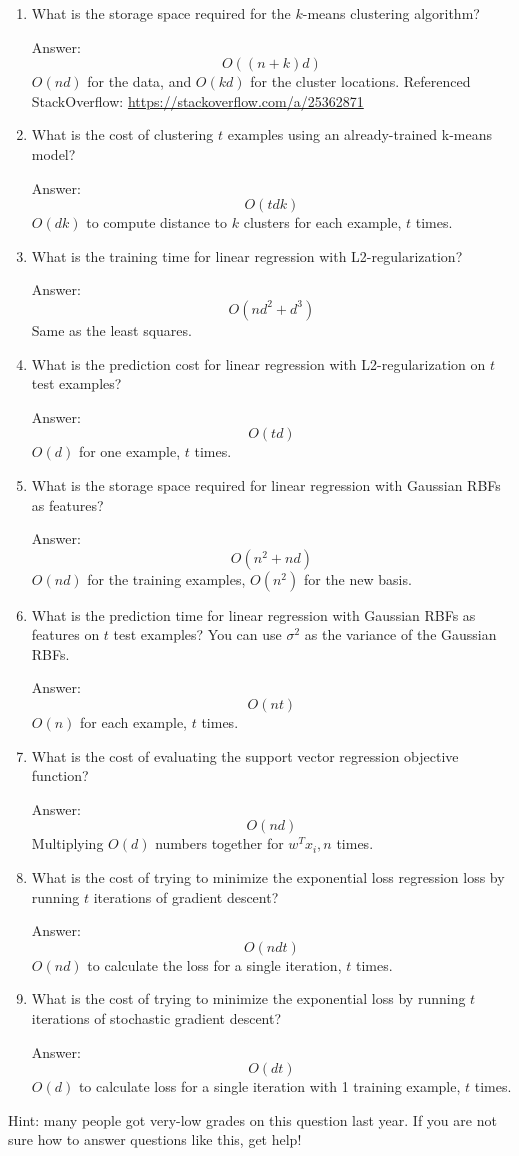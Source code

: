 \documentclass{article}
\def\ans#1{\par\gre{Answer: #1}}
\def\blu#1{{\color{blu}#1}}
\def\gre#1{{\color{gre}#1}}
\def\enum#1{\begin{enumerate}#1\end{enumerate}}
\begin{document}
\blu{
\enum{
\item What is the storage space required for the $k$-means clustering algorithm?
\ans{
\[O((n+k)d)\]
$O(nd)$ for the data, and $O(kd)$ for the cluster locations. Referenced StackOverflow: \url{https://stackoverflow.com/a/25362871}
}
\item What is the cost of clustering $t$ examples using an already-trained k-means model?
\ans{
\[O(tdk)\]
$O(dk)$ to compute distance to $k$ clusters for each example, $t$ times.
}
\item What is the training time for linear regression with L2-regularization?
\ans{
\[O(nd^2 + d^3)\]
Same as the least squares.
}
\item What is the prediction cost for linear regression with L2-regularization on $t$ test examples?
\ans{
\[O(td)\]
$O(d)$ for one example, $t$ times.
}
\pagebreak
\item What is the storage space required for linear regression with Gaussian RBFs as features?
\ans{
\[O(n^2 + nd)\]
$O(nd)$ for the training examples, $O(n^2)$ for the new basis.
}
\item What is the prediction time for linear regression with Gaussian RBFs as features on $t$ test examples? You can use $\sigma^2$ as the variance of the Gaussian RBFs.
\ans{
\[O(nt)\]
$O(n)$ for each example, $t$ times.
}
\item What is the cost of evaluating the support vector regression objective function?
\ans{
\[O(nd)\]
Multiplying $O(d)$ numbers together for $w^T x_i, n$ times.
}
\item What is the cost of trying to minimize the exponential loss regression loss by running $t$ iterations of  gradient descent?
\ans{
\[O(ndt)\]
$O(nd)$ to calculate the loss for a single iteration, $t$ times.
}
\item What is the cost of trying to minimize the exponential loss  by running $t$ iterations of stochastic gradient descent?
\ans{
\[O(dt)\]
$O(d)$ to calculate loss for a single iteration with 1 training example, $t$ times.
}
}
}
Hint: many people got very-low grades on this question last year. If you are not sure how to answer questions like this, get help!


 
\end{document}
